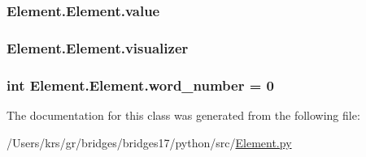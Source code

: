 \subsubsection[{value}]{\setlength{\rightskip}{0pt plus 5cm}Element.\+Element.\+value}\label{class_element_1_1_element_ae9c30f7574a4356686d93e4567cf61f8}
\hypertarget{class_element_1_1_element_a7a5b8e1891bf065fa81f51a8f6b4212e}{}
\subsubsection[{visualizer}]{\setlength{\rightskip}{0pt plus 5cm}Element.\+Element.\+visualizer}\label{class_element_1_1_element_a7a5b8e1891bf065fa81f51a8f6b4212e}
\hypertarget{class_element_1_1_element_a5e69f0ed0d43817e2546dd8bb3b467e0}{}
\subsubsection[{word\+\_\+number}]{\setlength{\rightskip}{0pt plus 5cm}int Element.\+Element.\+word\+\_\+number = 0\hspace{0.3cm}{\ttfamily [static]}}\label{class_element_1_1_element_a5e69f0ed0d43817e2546dd8bb3b467e0}


The documentation for this class was generated from the following file\+:\begin{DoxyCompactItemize}
\item 
/\+Users/krs/gr/bridges/bridges17/python/src/\hyperlink{_element_8py}{Element.\+py}\end{DoxyCompactItemize}
